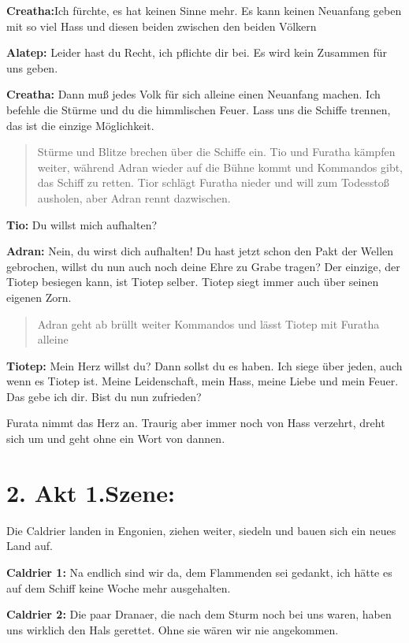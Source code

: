 \documentclass[a5paper,6pt]{book}
\begin{document}
\textbf{Creatha:}Ich fürchte, es hat keinen Sinne mehr. Es kann keinen Neuanfang geben mit so viel
Hass und diesen beiden zwischen den beiden Völkern

\textbf{Alatep:} Leider hast du Recht, ich pflichte dir bei. Es wird kein Zusammen für uns geben.

\textbf{Creatha:} Dann muß jedes Volk für sich alleine einen Neuanfang machen. Ich befehle die
Stürme und du die himmlischen Feuer. Lass uns die Schiffe trennen, das ist die einzige
Möglichkeit.

\begin{quote}
Stürme und Blitze brechen über die Schiffe ein. Tio und Furatha kämpfen weiter, während
Adran wieder auf die Bühne kommt und Kommandos gibt, das Schiff zu retten. Tior schlägt
Furatha nieder und will zum Todesstoß ausholen, aber Adran rennt dazwischen.
\end{quote}


\textbf{Tio:} Du willst mich aufhalten?

\textbf{Adran:} Nein, du wirst dich aufhalten! Du hast jetzt schon den Pakt der Wellen gebrochen,
willst du nun auch noch deine Ehre zu Grabe tragen? Der einzige, der Tiotep besiegen
kann, ist Tiotep selber. Tiotep siegt immer auch über seinen eigenen Zorn.

\begin{quote}
Adran geht ab brüllt weiter Kommandos und lässt Tiotep mit Furatha alleine
\end{quote}


\textbf{Tiotep:} Mein Herz willst du? Dann sollst du es haben. Ich siege über jeden, auch wenn es
Tiotep ist. Meine Leidenschaft, mein Hass, meine Liebe und mein Feuer. Das gebe ich
dir. Bist du nun zufrieden?

Furata nimmt das Herz an. Traurig aber immer noch von Hass verzehrt, dreht sich um und
geht ohne ein Wort von dannen.


\section{2. Akt 1.Szene:}

Die Caldrier landen in Engonien, ziehen weiter, siedeln und bauen sich ein neues Land auf.

\textbf{Caldrier 1:} Na endlich sind wir da, dem Flammenden sei gedankt, ich hätte es auf dem Schiff
keine Woche mehr ausgehalten.

\textbf{Caldrier 2:} Die paar Dranaer, die nach dem Sturm noch bei uns waren, haben uns wirklich
den Hals gerettet. Ohne sie wären wir nie angekommen.
\end{document}
